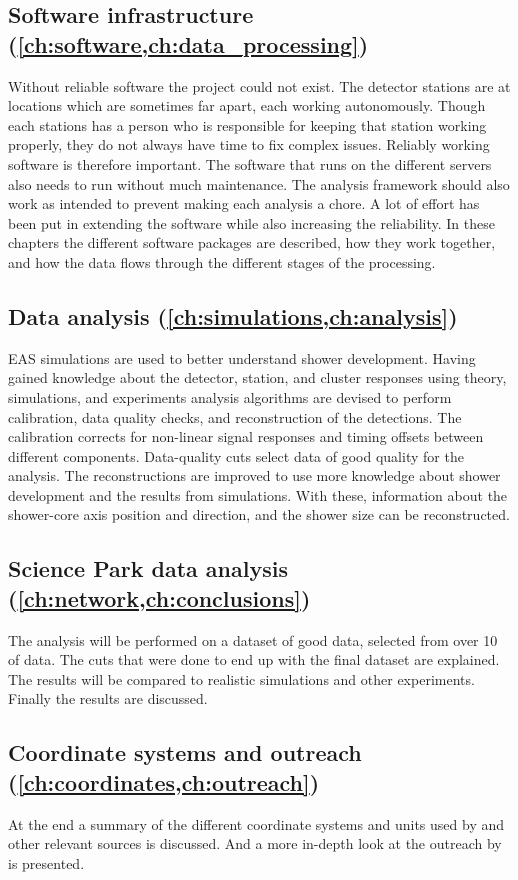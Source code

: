 \subsection{Software infrastructure
            (\cref{ch:software,ch:data_processing})}

Without reliable software the \hisparc project could not exist. The detector stations are at locations which are sometimes far apart, each working autonomously. Though each stations has a person who is responsible for keeping that station working properly, they do not always have time to fix complex issues. Reliably working software is therefore important. The software that runs on the different \hisparc servers also needs to run without much maintenance. The analysis framework should also work as intended to prevent making each analysis a chore. A lot of effort has been put in extending the software while also increasing the reliability. In these chapters the different software packages are described, how they work together, and how the data flows through the different stages of the processing.


\subsection{Data analysis
            (\cref{ch:simulations,ch:analysis})}

EAS simulations are used to better understand shower development. Having gained knowledge about the detector, station, and cluster responses using theory, simulations, and experiments analysis algorithms are devised to perform calibration, data quality checks, and reconstruction of the detections. The calibration corrects for non-linear signal responses and timing offsets between different components. Data-quality cuts select data of good quality for the analysis. The reconstructions are improved to use more knowledge about shower development and the results from simulations. With these, information about the shower-core axis position and direction, and the shower size can be reconstructed.


\subsection{Science Park data analysis
            (\cref{ch:network,ch:conclusions})}

The analysis will be performed on a dataset of good data, selected from over \SI{10}{\year} of \hisparc data. The cuts that were done to end up with the final dataset are explained. The results will be compared to realistic simulations and other experiments. Finally the results are discussed.


\subsection{Coordinate systems and outreach
            (\cref{ch:coordinates,ch:outreach})}

At the end a summary of the different coordinate systems and units used by \hisparc and other relevant sources is discussed. And a more in-depth look at the outreach by \hisparc is presented.
